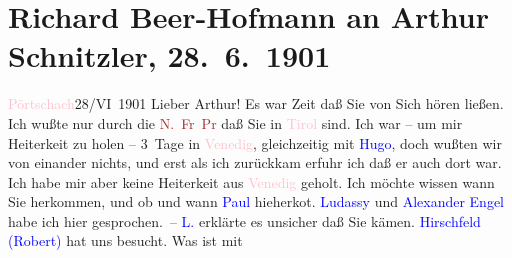 

               \section[Richard Beer-Hofmann an Arthur Schnitzler, 28. 6. 1901]{ Richard Beer-Hofmann an Arthur Schnitzler,
               28. 6. 1901}\nopagebreak{}\rehead{ }\normalsize\beginnumbering{} \toendnotes[C]{\smallbreak\pagebreak[2]} 
\toendnotes[C]{\smallbreak}\pstart
           \raggedleft{}{\pb}\textcolor{pink}{Pörtschach}{}\ledrightnote{\textcolor{pink}{Pörtschach}}{ }28/VI 1901\pend
           \pstart
           Lieber Arthur! Es war Zeit daß Sie von Sich hören ließen. Ich wußte
               nur durch die \textcolor{green}{\textcolor{brown}{N. Fr Pr}{}\ledrightnote{\textcolor{brown}{Neue Freie Presse}}}{} daß Sie in \textcolor{pink}{Tirol}{}\ledrightnote{\textcolor{pink}{Tirol}} sind. Ich war – um mir
               Heiterkeit zu holen – 3 Tage in \textcolor{pink}{Venedig}{}\ledrightnote{\textcolor{pink}{Venedig}},
               gleichzeitig mit \textcolor{blue}{Hugo}{}\ledrightnote{\textcolor{blue}{Hugo von Hofmannsthal}}, doch wußten wir von
               einander nichts, und erst als ich zurückkam erfuhr ich daß er auch dort war. Ich habe
               mir aber keine Heiterkeit aus \textcolor{pink}{Venedig}{}\ledrightnote{\textcolor{pink}{Venedig}} geholt.\pend
           \pstart
           {\pb}Ich möchte wissen wann Sie
               herkommen, und ob und wann \textcolor{blue}{Paul}{}\ledrightnote{\textcolor{blue}{Paul Goldmann}} hieherko{\geminationm}t. \textcolor{blue}{Ludassy}{}\ledrightnote{\textcolor{blue}{Julius von Gans-Ludassy}} und \textcolor{blue}{Alexander Engel}{}\ledrightnote{\textcolor{blue}{Alexander Engel}} habe ich hier gesprochen. – \textcolor{blue}{L.}{}\ledrightnote{\textcolor{blue}{Julius von Gans-Ludassy}} erklärte es unsicher daß Sie kämen. \textcolor{blue}{Hirschfeld (Robert)}{}\ledrightnote{\textcolor{blue}{Robert Hirschfeld}} hat uns besucht. Was ist mit
